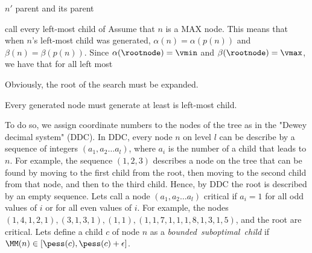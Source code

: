 $n'$ parent and its parent

call every left-most child of 
Assume that $n$ is a MAX node. 
This means that when $n$'s left-most child was generated, 
$\alpha(n)=\alpha(p(n))$ and $\beta(n)=\beta(p(n))$. 
Since $\alpha(\rootnode)=\vmin$ and $\beta(\rootnode)=\vmax$, 
we have that for all left most 

Obviously, the root of the search must be expanded. 

Every generated node must generate at least is left-most child. 


To do so, we assign coordinate numbers to the nodes of the tree as in the "Dewey decimal system" (DDC). In DDC, every node $n$ on level $l$ can be describe by a sequence of integers $(a_1, a_2 \ldots a_l)$, where $a_i$ is the number of a child
that leads to $n$. For example, the sequence $(1, 2, 3)$ describes a node on the tree that can be found by 
moving to the first child from the root, then moving to the second child from that node, and then to the third child. Hence, by DDC the root is described by an empty sequence. 
Lets call a node $(a_1, a_2 \ldots a_l)$ critical if $a_i=1$ for all odd values of $i$ or for all even values of $i$. For example, the nodes $(1, 4, 1, 2, 1), (3, 1, 3, 1), (1, 1), (1, 1, 7, 1, 1, 1, 8, 1, 3, 1, 5)$, and the root are critical.
Lets define a child $c$ of node $n$ as a \emph{bounded~suboptimal~child} if $\MM(n)\in [\pess(c), \pess(c)+\epsilon]$. 



